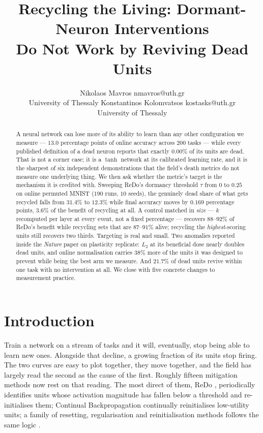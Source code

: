 \documentclass[10pt]{article}
\title{Recycling the Living: Dormant-Neuron Interventions\\
       Do Not Work by Reviving Dead Units}
\author{%
  \name Nikolaos Mavros \email nmavros@uth.gr \\
  \addr University of Thessaly
  \AND
  \name Konstantinos Kolomvatsos \email kostasks@uth.gr \\
  \addr University of Thessaly
}
\begin{document}
\maketitle

\begin{abstract}
A neural network can lose more of its ability to learn than any other
configuration we measure --- $13.0$ percentage points of online accuracy across
$200$ tasks --- while every published definition of a dead neuron reports that
exactly $0.00\%$ of its units are dead. That is not a corner case; it is a
$\tanh$ network at its calibrated learning rate, and it is the sharpest of six
independent demonstrations that the field's death metrics do not measure one
underlying thing. We then ask whether the metric's target is the mechanism it is
credited with. Sweeping ReDo's dormancy threshold $\tau$ from $0$ to $0.25$ on
online permuted MNIST ($190$ runs, $10$ seeds), the genuinely dead share of what
gets recycled falls from $31.4\%$ to $12.3\%$ while final accuracy moves by
$0.169$ percentage points, $3.6\%$ of the benefit of recycling at all. A control
matched in \emph{size} --- $k$ recomputed per layer at every event, not a fixed
percentage --- recovers $88$--$92\%$ of ReDo's benefit while recycling sets that
are $87$--$91\%$ alive; recycling the \emph{highest}-scoring units still recovers
two thirds. Targeting is real and small. Two anomalies reported inside the
\emph{Nature} paper on plasticity replicate: $L_2$ at its beneficial dose nearly
doubles dead units, and online normalisation carries $38\%$ more of the units it
was designed to prevent while being the best arm we measure. And $21.7\%$ of dead
units revive within one task with no intervention at all. We close with five
concrete changes to measurement practice.
\end{abstract}

\section{Introduction}

Train a network on a stream of tasks and it will, eventually, stop being able to
learn new ones. Alongside that decline, a growing fraction of its units stop
firing. The two curves are easy to plot together, they move together, and the
field has largely read the second as the cause of the first. Roughly fifteen
mitigation methods now rest on that reading. The most direct of them, ReDo
\citep{sokar2023dormant}, periodically identifies units whose activation
magnitude has fallen below a threshold and re-initialises them; Continual
Backpropagation \citep{dohare2024loss} continually reinitialises low-utility
units; a family of resetting, regularisation and reinitialisation methods
follows the same logic \citep{nikishin2022primacy, kumar2023maintaining,
elsayed2024addressing, hernandezgarcia2025reinitializing}.
\end{document}

